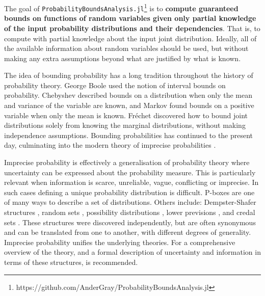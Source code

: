 \documentclass{juliacon}
\begin{document}
The goal of \texttt{ProbabilityBoundsAnalysis.jl}\footnote{https://github.com/AnderGray/ProbabilityBoundsAnalysis.jl} is to \textbf{compute guaranteed bounds on functions of random variables given only partial knowledge of the input probability distributions and their dependencies}. That is, to compute with partial knowledge about the input joint distribution. Ideally, all of the available information about random variables should be used, but without making any extra assumptions beyond what are justified by what is known.

The idea of bounding probability has a long tradition throughout the history of probability theory. George Boole \cite{boole1854investigation, hailperin1986boole} used the notion of interval bounds on probability. Chebyshev \cite{chebyshev1874valeurs} described bounds on a distribution when only the mean and variance of the variable are known, and Markov \cite{markoff1900question} found bounds on a positive variable when only the mean is known.  Fréchet \cite{frechet1935generalisation} discovered how to bound joint distributions solely from knowing the marginal distributions, without making independence assumptions. Bounding probabilities has continued to the present day, culminating into the modern theory of imprecise probabilities \cite{walley1991statistical, klir2013uncertainty, troffaes2014lower, augustin2014introduction}.

Imprecise probability is effectively a generalisation of probability theory where uncertainty can be expressed about the probability measure. This is particularly relevant when information is scarce, unreliable, vague, conflicting or imprecise. In such cases defining a unique probability distribution is difficult. P-boxes are one of many ways to describe a set of distributions. Others include: Dempster-Shafer structures \cite{dempster2008upper,shafer1976mathematical}, random sets \cite{molchanov2005theory}, possibility distributions \cite{zadeh1978fuzzy,dubois1988possibility, hose2019possibilistic}, lower previsions \cite{troffaes2014lower}, and credal sets \cite{levi1983enterprise}. These structures were discovered independently, but are often synonymous and can be translated from one to another, with different degrees of generality. Imprecise probability unifies the underlying theories. For a comprehensive overview of the theory, and a formal description of uncertainty and information in terms of these structures, \cite{klir2013uncertainty} is recommended.
\end{document}

